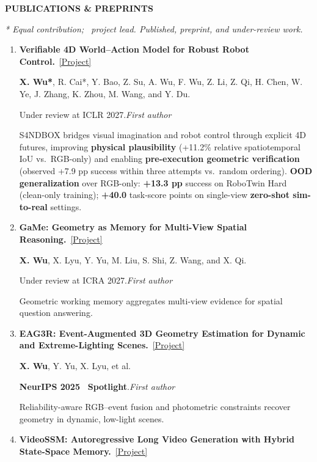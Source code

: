 \documentclass[a4paper]{article}
\newcommand{\cvsection}[1]{%
  \par\vspace{2.0pt}%
  {\color{cvblue}\fontsize{11}{12.2}\selectfont\bfseries\MakeUppercase{#1}}\par
  \vspace{-4pt}{\color{cvblue}\rule{\textwidth}{0.4pt}}\par\vspace{1.0pt}%
}
\newcommand{\pubgroup}[1]{%
  \par\vspace{2.0pt}{\color{cvblue}\fontsize{9.4}{10.4}\selectfont\bfseries #1}\par
}
\newcommand{\pubnote}[1]{\par{\color{cvgray}#1}}
\begin{document}
\cvsection{Publications \& Preprints}
{\fontsize{9}{9.65}\selectfont
\textit{* Equal contribution; \textdagger\ project lead. Published, preprint, and under-review work.}\par
\pubgroup{First- and Co-first-author Work}
\begin{enumerate}[leftmargin=1.6em,labelsep=0.38em,itemsep=0.4pt,topsep=1.3pt,parsep=0pt,partopsep=0pt]
\item \textbf{Verifiable 4D World--Action Model for Robust Robot Control.}~\href{https://candy-crusher.github.io/xiaoshanwu.github.io/projects/sandbox/}{\textcolor{cvblue}{[Project]}}\par
\textbf{X. Wu*}, R. Cai*, Y. Bao, Z. Su, A. Wu, F. Wu, Z. Li, Z. Qi, H. Chen, W. Ye, J. Zhang, K. Zhou, M. Wang, and Y. Du.\par
Under review at ICLR 2027.\hfill\textcolor{cvblue}{\textit{First author}}
\pubnote{S4NDBOX bridges visual imagination and robot control through explicit 4D futures, improving \textbf{physical plausibility} (+11.2\% relative spatiotemporal IoU vs.\ RGB-only) and enabling \textbf{pre-execution geometric verification} (observed +7.9 pp success within three attempts vs.\ random ordering).} \textbf{OOD generalization} over RGB-only: \textbf{+13.3 pp} success on RoboTwin Hard (clean-only training); \textbf{+40.0} task-score points on single-view \textbf{zero-shot sim-to-real} settings.
\item \textbf{GaMe: Geometry as Memory for Multi-View Spatial Reasoning.}~\href{https://candy-crusher.github.io/xiaoshanwu.github.io/projects/game/}{\textcolor{cvblue}{[Project]}}\par
\textbf{X. Wu}, X. Lyu, Y. Yu, M. Liu, S. Shi, Z. Wang, and X. Qi.\par
Under review at ICRA 2027.\hfill\textcolor{cvblue}{\textit{First author}}
\pubnote{Geometric working memory aggregates multi-view evidence for spatial question answering.}
\item \textbf{EAG3R: Event-Augmented 3D Geometry Estimation for Dynamic and Extreme-Lighting Scenes.}~\href{https://candy-crusher.github.io/xiaoshanwu.github.io/projects/eag3r/}{\textcolor{cvblue}{[Project]}}\par
\textbf{X. Wu}, Y. Yu, X. Lyu, et al.\par
\textbf{NeurIPS 2025} \textcolor{cvred}{\textbf{\textperiodcentered\ Spotlight}}.\hfill\textcolor{cvblue}{\textit{First author}}
\pubnote{Reliability-aware RGB--event fusion and photometric constraints recover geometry in dynamic, low-light scenes.}
\item \textbf{VideoSSM: Autoregressive Long Video Generation with Hybrid State-Space Memory.}~\href{https://candy-crusher.github.io/xiaoshanwu.github.io/projects/videossm/}{\textcolor{cvblue}{[Project]}}\par

\end{enumerate}}
\end{document}
